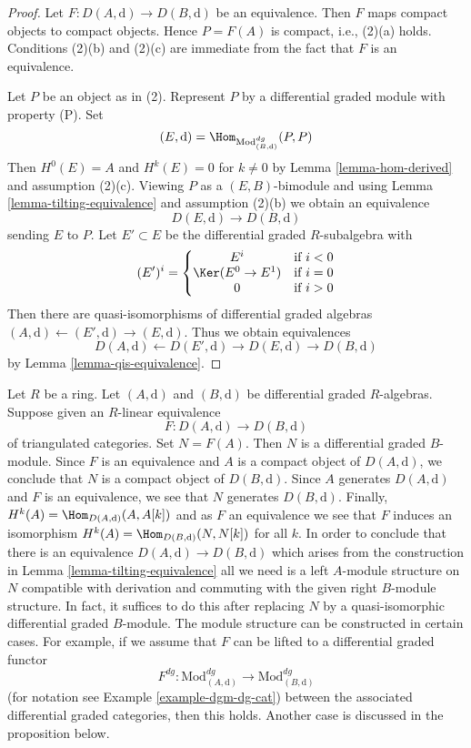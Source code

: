 \begin{proof}
Let $F : D(A, \text{d}) \to D(B, \text{d})$ be an equivalence.
Then $F$ maps compact objects to compact objects. Hence $P = F(A)$ is
compact, i.e., (2)(a) holds. Conditions (2)(b) and (2)(c) are immediate
from the fact that $F$ is an equivalence.

\medskip\noindent
Let $P$ be an object as in (2). Represent $P$ by a
differential graded module with property (P). Set
$$
(E, \text{d}) = \Hom_{\text{Mod}^{dg}_{(B, \text{d})}}(P, P)
$$
Then $H^0(E) = A$ and $H^k(E) = 0$ for $k \not = 0$ by
Lemma \ref{lemma-hom-derived} and assumption (2)(c).
Viewing $P$ as a $(E, B)$-bimodule and using
Lemma \ref{lemma-tilting-equivalence} and assumption (2)(b)
we obtain an equivalence
$$
D(E, \text{d}) \to D(B, \text{d})
$$
sending $E$ to $P$.
Let $E' \subset E$ be the differential graded $R$-subalgebra
with
$$
(E')^i = \left\{
\begin{matrix}
E^i & \text{if }i < 0 \\
\Ker(E^0 \to E^1) & \text{if }i = 0 \\
0 & \text{if }i > 0
\end{matrix}
\right.
$$
Then there are quasi-isomorphisms of differential graded
algebras $(A, \text{d}) \leftarrow (E', \text{d}) \rightarrow (E, \text{d})$.
Thus we obtain equivalences
$$
D(A, \text{d}) \leftarrow D(E', \text{d}) \rightarrow D(E, \text{d})
\rightarrow D(B, \text{d})
$$
by Lemma \ref{lemma-qis-equivalence}.
\end{proof}

\begin{remark}
\label{remark-lift-equivalence-to-dga}
Let $R$ be a ring. Let $(A, \text{d})$ and $(B, \text{d})$ be differential
graded $R$-algebras. Suppose given an $R$-linear equivalence
$$
F : D(A, \text{d}) \longrightarrow D(B, \text{d})
$$
of triangulated categories. Set $N = F(A)$. Then $N$ is a differential
graded $B$-module. Since $F$ is an equivalence and $A$ is a compact
object of $D(A, \text{d})$, we conclude that $N$ is a compact object
of $D(B, \text{d})$. Since $A$ generates $D(A, \text{d})$ and
$F$ is an equivalence, we see that $N$ generates $D(B, \text{d})$.
Finally, $H^k(A) = \Hom_{D(A, \text{d})}(A, A[k])$ and as $F$ an equivalence
we see that $F$ induces an isomorphism
$H^k(A) = \Hom_{D(B, \text{d})}(N, N[k])$ for all $k$.
In order to conclude that there is an equivalence
$D(A, \text{d}) \longrightarrow D(B, \text{d})$ which
arises from the construction in
Lemma \ref{lemma-tilting-equivalence}
all we need is a left $A$-module structure on $N$
compatible with derivation and commuting
with the given right $B$-module structure. In fact, it
suffices to do this after replacing $N$ by a quasi-isomorphic
differential graded $B$-module.
The module structure can be constructed in certain cases.
For example, if we assume that $F$ can be lifted to a
differential graded functor
$$
F^{dg} :
\text{Mod}^{dg}_{(A, \text{d})}
\longrightarrow
\text{Mod}^{dg}_{(B, \text{d})}
$$
(for notation see Example \ref{example-dgm-dg-cat})
between the associated differential graded categories,
then this holds. Another case is discussed in the proposition below.
\end{remark}

